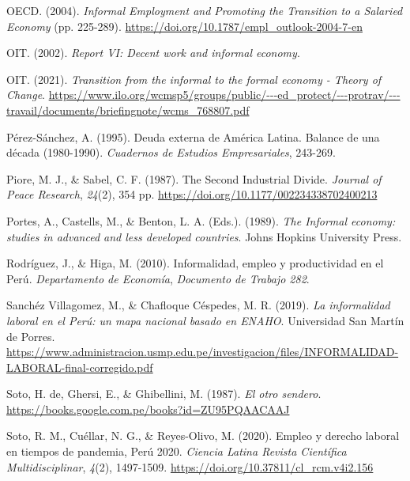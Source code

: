 \documentclass[
  letterpaper,
  12pt,
  oneside,
  spanish,
  doublespacing,
  headsepline,
  parskip]{MastersDoctoralThesis}
\newlength{\cslhangindent}
\newlength{\cslentryspacingunit} %
\newenvironment{CSLReferences}[2] %
 {%
  \setlength{\parindent}{0pt}
  \ifodd #1
  \let\oldpar\par
  \def\par{\hangindent=\cslhangindent\oldpar}
  \fi
  \setlength{\parskip}{#2\cslentryspacingunit}
 }%
 {}
\begin{document}
\begin{CSLReferences}{1}{0}
\leavevmode{}%
OECD. (2004). \emph{Informal Employment and Promoting the Transition to
a Salaried Economy} (pp. 225-289).
\url{https://doi.org/10.1787/empl_outlook-2004-7-en}

\leavevmode{}%
OIT. (2002). \emph{Report VI: Decent work and informal economy}.

\leavevmode{}%
OIT. (2021). \emph{Transition from the informal to the formal economy -
Theory of Change}.
\url{https://www.ilo.org/wcmsp5/groups/public/---ed_protect/---protrav/---travail/documents/briefingnote/wcms_768807.pdf}

\leavevmode{}%
Pérez-Sánchez, A. (1995). Deuda externa de América Latina. Balance de
una década (1980-1990). \emph{Cuadernos de Estudios Empresariales},
243-269.

\leavevmode{}%
Piore, M. J., \& Sabel, C. F. (1987). The Second Industrial Divide.
\emph{Journal of Peace Research}, \emph{24}(2), 354 pp.
\url{https://doi.org/10.1177/002234338702400213}

\leavevmode{}%
Portes, A., Castells, M., \& Benton, L. A. (Eds.). (1989). \emph{The
Informal economy: studies in advanced and less developed countries}.
Johns Hopkins University Press.

\leavevmode{}%
Rodríguez, J., \& Higa, M. (2010). Informalidad, empleo y productividad
en el Perú. \emph{Departamento de Economía}, \emph{Documento de Trabajo
282}.

\leavevmode{}%
Sanchéz Villagomez, M., \& Chafloque Céspedes, M. R. (2019). \emph{La
informalidad laboral en el Perú: un mapa nacional basado en ENAHO}.
Universidad San Martín de Porres.
\url{https://www.administracion.usmp.edu.pe/investigacion/files/INFORMALIDAD-LABORAL-final-corregido.pdf}

\leavevmode{}%
Soto, H. de, Ghersi, E., \& Ghibellini, M. (1987). \emph{El otro
sendero}. \url{https://books.google.com.pe/books?id=ZU95PQAACAAJ}

\leavevmode{}%
Soto, R. M., Cuéllar, N. G., \& Reyes-Olivo, M. (2020). Empleo y derecho
laboral en tiempos de pandemia, Perú 2020. \emph{Ciencia Latina Revista
Científica Multidisciplinar}, \emph{4}(2), 1497-1509.
\url{https://doi.org/10.37811/cl_rcm.v4i2.156}


\end{CSLReferences}
\end{document}
